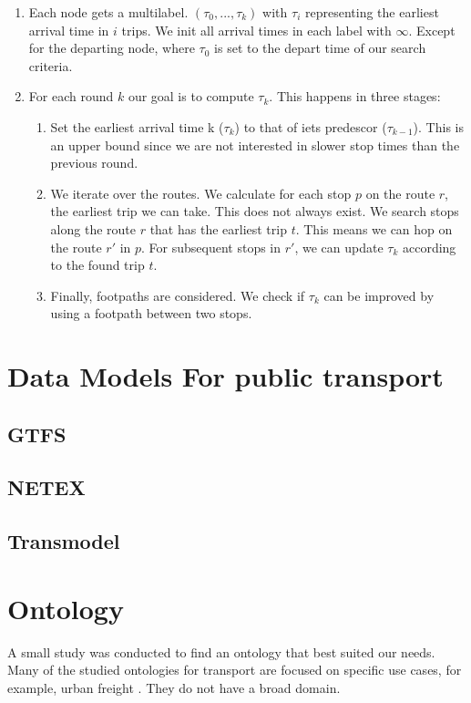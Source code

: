 \begin{enumerate}
    \item Each node gets a multilabel. $(\tau_0,...,\tau_k)$ with $\tau_i$ representing the earliest arrival time in $i$ trips. We init all arrival times in each label with $\infty$. Except for the departing node, where $\tau_0$ is set to the depart time of our search criteria.
    \item For each round $k$ our goal is to compute $\tau_k$. This happens in three stages:\begin{enumerate}
        \item Set the earliest arrival time k ($\tau_k$) to that of iets predescor ($\tau_{k-1}$). This is an upper bound since we are not interested in slower stop times than the previous round.
        \item We iterate over the routes. We calculate for each stop $p$ on the route $r$, the earliest trip we can take. This does not always exist. We search stops along the route $r$ that has the earliest trip $t$. This means we can hop on the route $r'$ in $p$. For subsequent stops in $r'$, we can update $\tau_k$ according to the found trip $t$.
        \item Finally, footpaths are considered. We check if $\tau_k$ can be improved by using a footpath between two stops. 
    \end{enumerate}
\end{enumerate}

\section{Data Models For public transport}
\subsection{GTFS}
\subsection{NETEX} %
\subsection{Transmodel}
\section{Ontology}

A small study was conducted to find an ontology that best suited our needs. Many of the studied ontologies for transport are focused on specific use cases, for example, urban freight \cite{bouhana_ontology-based_2015}. They do not have a broad domain. 

